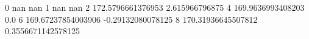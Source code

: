 0 nan nan
1 nan nan
2 172.5796661376953 2.615966796875
4 169.9636993408203 0.0
6 169.67237854003906 -0.29132080078125
8 170.31936645507812 0.3556671142578125
